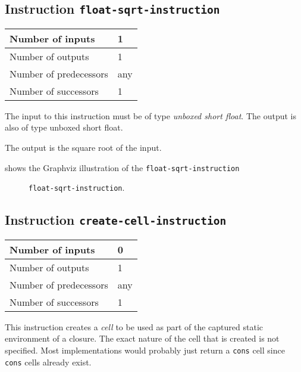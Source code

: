 \subsection{Instruction \texttt{float-sqrt-instruction}}
\label{mir-instruction-float-div}

\begin{tabular}{|l|l|}
\hline
Number of inputs & 1\\
\hline
Number of outputs & 1\\
\hline
Number of predecessors & any\\
\hline
Number of successors & 1\\
\hline
\end{tabular}

The input to this instruction must be of type \emph{unboxed short
  float}. The output is also of type unboxed short float.

The output is the square root of the input.

 shows the Graphviz illustration of the
\texttt{float-sqrt-instruction}

\begin{figure}
\begin{center}
\end{center}
\caption{\label{fig-float-sqrt-instruction}
\texttt{float-sqrt-instruction}.}
\end{figure}

\subsection{Instruction \texttt{create-cell-instruction}}
\label{mir-instruction-create-cell}

\begin{tabular}{|l|l|}
\hline
Number of inputs & 0\\
\hline
Number of outputs & 1\\
\hline
Number of predecessors & any\\
\hline
Number of successors & 1\\
\hline
\end{tabular}

This instruction creates a \emph{cell} to be used as part of the
captured static environment of a closure.  The exact nature of the
cell that is created is not specified.  Most implementations would
probably just return a \texttt{cons} cell since \texttt{cons} cells
already exist.

